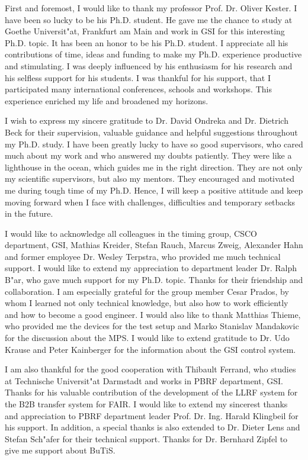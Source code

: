 First and foremost, I would like to thank my professor Prof. Dr. Oliver Kester. I have been so lucky to be his Ph.D. student. He gave me the chance to study at Goethe Universit"at, Frankfurt am Main and work in GSI for this interesting Ph.D. topic. It has been an honor to be his Ph.D. student. I appreciate all his contributions of time, ideas and funding to make my Ph.D. experience productive and stimulating. I was deeply influenced by his enthusiasm for his research and his selfless support for his students. I was thankful for his support, that I participated many international conferences, schools and workshops. This experience enriched my life and  
broadened my horizons.

I wish to express my sincere gratitude to Dr. David Ondreka and Dr. Dietrich Beck for their supervision, valuable guidance and helpful suggestions throughout my Ph.D. study. I have been greatly lucky to have so good supervisors, who cared much about my work and who answered my doubts patiently. They were like a lighthouse in the ocean, which guides me in the right direction. They are not only my  scientific supervisors, but also my mentors. They encouraged and motivated me during tough time of my Ph.D. Hence, I will keep a positive attitude and keep moving forward when I face with challenges, difficulties and temporary setbacks in the future.

I would like to acknowledge all colleagues in the timing group, \gls{CSCO} department, GSI, Mathias Kreider, Stefan Rauch, Marcus Zweig, Alexander Hahn and former employee Dr. Wesley Terpstra, who provided me much technical support. I would like to extend my appreciation to department leader Dr. Ralph B"ar, who gave much support for my Ph.D. topic. Thanks for their friendship and collaboration. I am especially grateful for the group member Cesar Prados, by whom I learned not only technical knowledge, but also how to work efficiently and how to become a good engineer. I would also like to thank Matthias Thieme, who provided me the devices for the test setup and Marko Stanislav Mandakovic for the discussion about the MPS. I would like to extend gratitude to Dr. Udo Krause and  Peter Kainberger for the information about the GSI control system.

I am also thankful for the good cooperation with Thibault Ferrand, who studies at Technische Universit"at Darmstadt and works in \gls{PBRF} department, GSI. Thanks for his valuable contribution of the development of the LLRF system for the B2B transfer system for FAIR. I would like to extend my sincerest thanks and appreciation to PBRF department leader Prof. Dr. Ing. Harald Klingbeil for his support. In addition, a special thanks is also extended to Dr. Dieter Lens and Stefan Sch"afer for their technical support. Thanks for Dr. Bernhard Zipfel to give me support about BuTiS.


